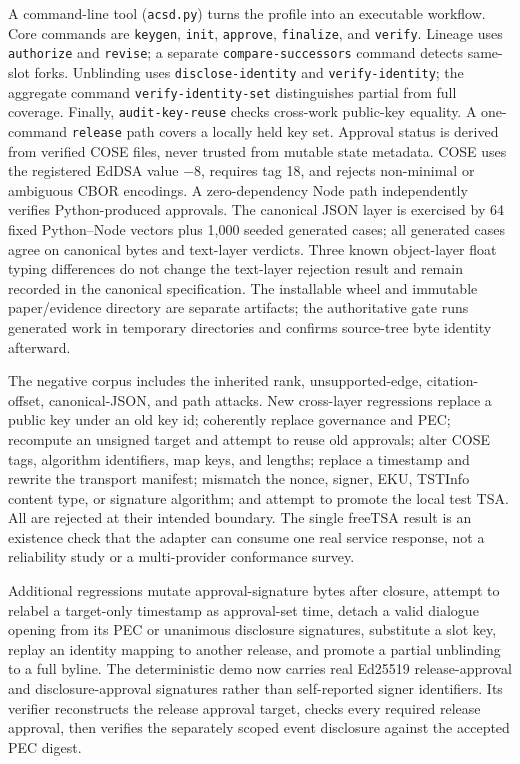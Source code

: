 \documentclass[11pt]{article}
\begin{document}
A command-line tool (\texttt{acsd.py}) turns the profile into an executable
workflow. Core commands are \texttt{keygen}, \texttt{init}, \texttt{approve},
\texttt{finalize}, and \texttt{verify}. Lineage uses \texttt{authorize} and
\texttt{revise}; a separate \texttt{compare-successors} command detects
same-slot forks. Unblinding uses \texttt{disclose-identity} and
\texttt{verify-identity}; the aggregate command
\texttt{verify-identity-set} distinguishes partial from full coverage.
Finally, \texttt{audit-key-reuse} checks cross-work public-key equality. A
one-command \texttt{release} path covers a locally held key set. Approval
status is derived
from verified COSE files, never trusted from mutable state metadata. COSE uses
the registered EdDSA value $-8$, requires tag 18, and rejects non-minimal or
ambiguous CBOR encodings. A zero-dependency Node path independently verifies
Python-produced approvals. The canonical JSON layer is exercised by 64 fixed
Python--Node vectors plus 1,000 seeded generated cases; all generated cases
agree on canonical bytes and text-layer verdicts. Three known object-layer
float typing differences do not change the text-layer rejection result and
remain recorded in the canonical specification. The installable wheel and
immutable paper/evidence directory are separate artifacts; the authoritative
gate runs generated work in temporary directories and confirms source-tree
byte identity afterward.

The negative corpus includes the inherited rank, unsupported-edge,
citation-offset, canonical-JSON, and path attacks. New cross-layer regressions
replace a public key under an old key id; coherently replace governance and PEC;
recompute an unsigned target and attempt to reuse old approvals; alter COSE tags,
algorithm identifiers, map keys, and lengths; replace a timestamp and rewrite
the transport manifest; mismatch the nonce, signer, EKU, TSTInfo content type,
or signature algorithm; and attempt to promote the local test TSA. All are
rejected at their intended boundary. The single freeTSA result is an existence
check that the adapter can consume one real service response, not a reliability
study or a multi-provider conformance survey.

Additional regressions mutate approval-signature bytes after closure, attempt
to relabel a target-only timestamp as approval-set time, detach a valid dialogue
opening from its PEC or unanimous disclosure signatures, substitute a slot
key, replay an identity mapping to another release, and promote a partial
unblinding to a full byline. The deterministic demo now carries real Ed25519
release-approval and disclosure-approval signatures rather than self-reported
signer identifiers. Its verifier reconstructs the release approval target,
checks every required release approval, then verifies the separately scoped
event disclosure against the accepted PEC digest.
\end{document}
